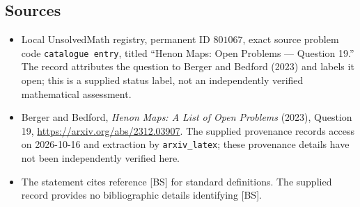 \documentclass[11pt]{article}
\begin{document}
\subsection{Sources}
\begin{itemize}
\item Local UnsolvedMath registry, permanent ID \(801067\), exact source problem code \texttt{catalogue entry}, titled ``Henon Maps: Open Problems --- Question 19.'' The record attributes the question to Berger and Bedford (2023) and labels it open; this is a supplied status label, not an independently verified mathematical assessment.
\item Berger and Bedford, \emph{Henon Maps: A List of Open Problems} (2023), Question 19, \url{https://arxiv.org/abs/2312.03907}. The supplied provenance records access on 2026-10-16 and extraction by \texttt{arxiv\_latex}; these provenance details have not been independently verified here.
\item The statement cites reference [BS] for standard definitions. The supplied record provides no bibliographic details identifying [BS].
\end{itemize}
\end{document}

